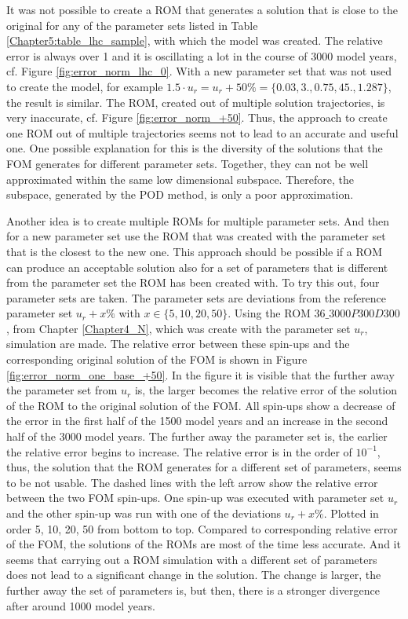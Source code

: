 It was not possible to create a ROM that generates a solution that is close to the original for any of the parameter sets listed in Table \ref{Chapter5:table_lhc_sample}, with which the model was created. The relative 
error is always over 1 and it is oscillating a lot in the course of 3000 model years, cf. Figure \ref{fig:error_norm_lhc_0}. With a new parameter set that was not used to create the model, for example 
$1.5 \cdot u_r = u_r + 50\% = \{0.03,3.,0.75,45.,1.287\}$, the result is similar. The ROM, created out of multiple solution trajectories, is very inaccurate, cf. Figure \ref{fig:error_norm_+50}.
Thus, the approach to create one ROM out of multiple trajectories seems not to lead to an accurate and useful one. One possible explanation for this is the diversity of the solutions that the FOM generates for different parameter sets.
Together, they can not be well approximated within the same low dimensional subspace. Therefore, the subspace, generated by the POD method, is only a poor approximation. 

Another idea is to create multiple ROMs for multiple parameter sets. And then for a new parameter set use the ROM that was created with the parameter set that is the closest to the new one. 
This approach should be possible if a ROM can produce an acceptable solution also for a set of parameters 
that is different from the parameter set the ROM has been created with.
To try this out, four parameter sets are taken. The parameter sets are deviations from the reference parameter set $u_r + x\%$ with $x\in \{5,10,20,50\}$.
Using the ROM $36\_3000P300D300$, from Chapter \ref{Chapter4_N}, which was create with the parameter set $u_r$, simulation are made. 
The relative error between these spin-ups and the corresponding original solution of the FOM is shown in Figure \ref{fig:error_norm_one_base_+50}. In the figure it is visible that the further away the parameter set from $u_r$ is, the larger becomes the relative error of the solution of the ROM to the original solution of the FOM. 
All spin-ups show a decrease of the error in the first half of the 1500 model years and an increase in the second half of the 3000 model years. The further away the parameter set is, the earlier the relative error begins to increase. 
The relative error is in the order of $10^{-1}$, thus, the solution that the ROM generates for a different set of parameters, seems to be not usable.  
The dashed lines with the left arrow show the relative error between the two FOM spin-ups. One spin-up was executed with parameter set $u_r$ and the other spin-up was run with one of the deviations $u_r + x\%$. Plotted in order 5, 10, 20, 50 from bottom to top. Compared to corresponding relative error of the FOM, the solutions of the ROMs are most of the time less accurate. And it seems that carrying out a ROM simulation with a different set of parameters does not lead to a significant change in the solution. The change is larger, the further away the set of parameters is, but then, there is a stronger divergence after around 1000 model years.

